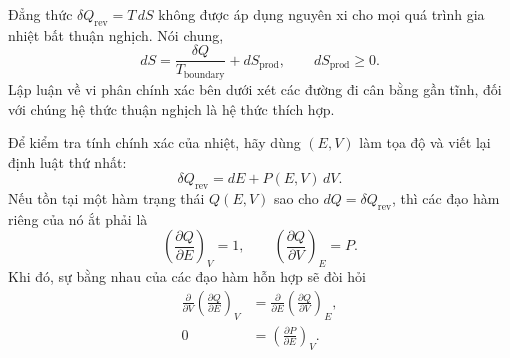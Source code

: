 \begin{classroomqa}
\end{classroomqa}

Đẳng thức \(\delta Q_{\mathrm{rev}}=T\,dS\) không được áp dụng nguyên xi cho mọi quá trình gia nhiệt bất thuận nghịch. Nói chung,
\begin{equation}
 dS=\frac{\delta Q}{T_{\mathrm{boundary}}}+dS_{\mathrm{prod}},
 \qquad dS_{\mathrm{prod}}\ge 0.
 \label{eq:sm6-entropy-production}
\end{equation}
Lập luận về vi phân chính xác bên dưới xét các đường đi cân bằng gần tĩnh, đối với chúng hệ thức thuận nghịch là hệ thức thích hợp.

\begin{classroomqa}
\end{classroomqa}

Để kiểm tra tính chính xác của nhiệt, hãy dùng \((E,V)\) làm tọa độ và viết lại định luật thứ nhất:
\begin{equation}
 \delta Q_{\mathrm{rev}}=dE+P(E,V)\,dV.
 \label{eq:sm6-heat-one-form}
\end{equation}
Nếu tồn tại một hàm trạng thái \(Q(E,V)\) sao cho \(dQ=\delta Q_{\mathrm{rev}}\),
thì các đạo hàm riêng của nó ắt phải là
\begin{equation}
 \left(\frac{\partial Q}{\partial E}\right)_V=1,
 \qquad
 \left(\frac{\partial Q}{\partial V}\right)_E=P.
 \label{eq:sm6-hypothetical-heat-derivatives}
\end{equation}
Khi đó, sự bằng nhau của các đạo hàm hỗn hợp sẽ đòi hỏi
\begin{equation}
 \begin{aligned}
 \frac{\partial}{\partial V}
 \left(\frac{\partial Q}{\partial E}\right)_V
 &=\frac{\partial}{\partial E}
 \left(\frac{\partial Q}{\partial V}\right)_E,\\
 0&=\left(\frac{\partial P}{\partial E}\right)_V.
 \end{aligned}
 \label{eq:sm6-heat-exactness-requirement}
\end{equation}

